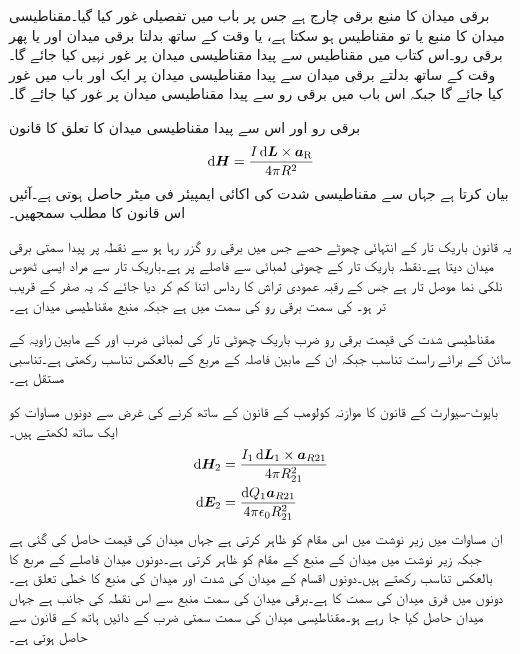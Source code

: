 برقی میدان کا منبع برقی چارج ہے جس پر باب  میں تفصیلی غور کیا گیا۔مقناطیسی میدان کا منبع یا تو مقناطیس ہو سکتا ہے، یا وقت کے ساتھ بدلتا برقی میدان اور یا پھر برقی رو۔اس کتاب میں مقناطیس سے پیدا مقناطیسی میدان پر غور نہیں کیا جائے گا۔وقت کے ساتھ بدلتے برقی میدان سے پیدا مقناطیسی میدان پر ایک اور باب میں غور کیا جائے گا جبکہ اس باب میں برقی رو سے پیدا مقناطیسی میدان پر غور کیا جائے گا۔

برقی رو اور اس سے پیدا مقناطیسی میدان کا تعلق  کا قانون
\begin{align}\label{مساوات_بایوٹ_سیوارٹ_تفرق_شکل}
\dif \kvec{H}=\frac{I \dif \kvec{L} \times \aR}{4 \pi R^2}
\end{align}
 بیان کرتا ہے جہاں سے مقناطیسی شدت  کی اکائی ایمپیئر فی میٹر  حاصل ہوتی ہے۔آئیں اس قانون کا مطلب سمجھیں۔

یہ قانون باریک تار کے انتہائی چھوٹے حصے  جس میں  برقی رو گزر رہا ہو سے  نقطہ  پر پیدا سمتی برقی میدان  دیتا ہے۔نقطہ  باریک تار کے چھوٹی لمبائی سے  فاصلے پر ہے۔باریک تار سے مراد ایسی ٹھوس نلکی نما موصل تار ہے جس کے رقبہ عمودی تراش کا رداس اتنا کم کر دیا جائے کہ یہ صفر کے قریب تر ہو۔ کی سمت برقی رو کی سمت میں ہے جبکہ  منبع مقناطیسی میدان ہے۔

مقناطیسی شدت کی قیمت برقی رو ضرب باریک چھوٹی تار کی لمبائی ضرب  اور  کے مابین زاویہ کے سائن کے برائے راست تناسب جبکہ ان کے مابین فاصلہ  کے مربع کے بالعکس تناسب رکھتی ہے۔تناسبی مستقل  ہے۔

بایوٹ-سیوارٹ کے  قانون کا موازنہ کولومب کے قانون کے ساتھ کرنے کی غرض سے دونوں مساوات کو ایک ساتھ لکھتے ہیں۔
\begin{align*}
\dif \kvec{H}_2&=\frac{I_1 \dif \kvec{L}_1 \times \kvec{a}_{R21}}{4 \pi R_{21}^2}\\
\dif \kvec{E}_2&=\frac{\dif Q_1 \kvec{a}_{R21}}{4\pi \epsilon_0 R_{21}^2}
\end{align*}
ان مساوات میں زیر نوشت میں  اس مقام کو ظاہر کرتی ہے جہاں میدان کی قیمت حاصل کی گئی ہے جبکہ زیر نوشت میں  میدان کے منبع کے مقام کو ظاہر کرتی ہے۔دونوں میدان فاصلے کے مربع کا بالعکس تناسب رکھتے ہیں۔دونوں اقسام کے میدان کی شدت اور میدان کی منبع کا خطی تعلق ہے۔دونوں میں فرق میدان کی سمت کا ہے۔برقی میدان کی سمت منبع سے اس نقطہ کی جانب ہے جہاں میدان حاصل کیا جا رہے ہو۔مقناطیسی میدان کی سمت سمتی ضرب کے دائیں ہاتھ کے قانون سے حاصل ہوتی ہے۔

